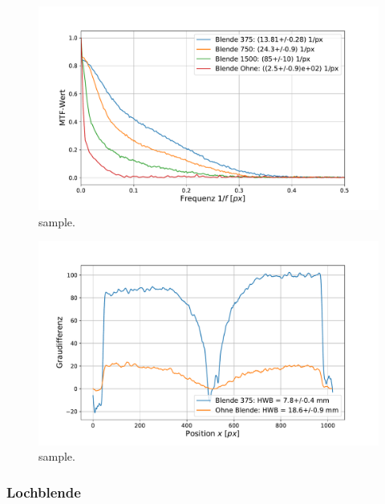 			\begin{figure}[ht]
				\centering
				\includegraphics[width=1\textwidth]{data/MTFKanteLinsen.pdf}
				\caption{sample.}
				\label{fig:MTF}	
			\end{figure}
					
			\begin{figure}[ht]
				\centering
				\includegraphics[width=1\textwidth]{data/Sterne.pdf}
				\caption{sample.}
				\label{fig:Sterne1}	
			\end{figure}
		
			
		\subsubsection{Lochblende}
			
